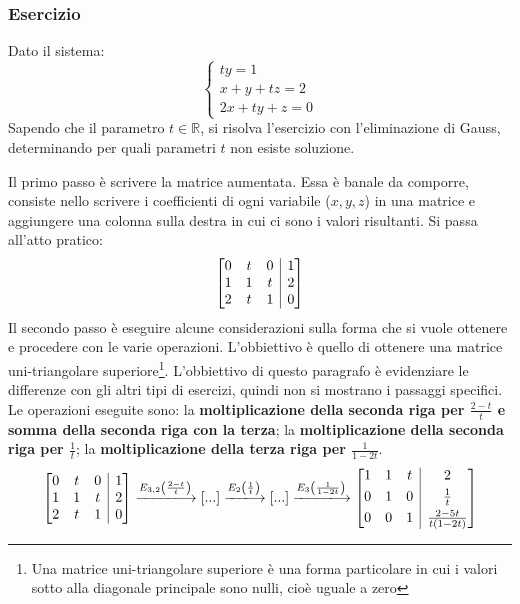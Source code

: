 \documentclass[a4paper]{article}
\makeatletter
\newenvironment{rowequmatbra}[1]{\left[\array{@{}#1@{}}}{\endarray\right]}
\makeatother
\begin{document}
	\subsubsection{Esercizio}
	
	Dato il sistema:
	\begin{equation*}
		\begin{cases}
			ty = 1 \\
			x + y + tz = 2 \\
			2x + ty + z = 0
		\end{cases}
	\end{equation*}
	Sapendo che il parametro $t \in \mathbb{R}$, si risolva l'esercizio con l'eliminazione di Gauss, determinando per quali parametri $t$ non esiste soluzione.\newline
	
	\noindent
	Il \textcolor{Red3}{primo passo} è scrivere la matrice aumentata. Essa è banale da comporre, consiste nello scrivere i coefficienti di ogni variabile ($x,y,z$) in una matrice e aggiungere una colonna sulla destra in cui ci sono i valori risultanti. Si passa all'atto pratico:
	\begin{equation*}
		\begin{rowequmatbra}{ccc|c}
			0  &  t &  0 &  1 \\
			1  &  1 &  t &  2 \\
			2  &  t &  1 &  0
		\end{rowequmatbra}
	\end{equation*}
	Il \textcolor{Red3}{secondo passo} è eseguire alcune considerazioni sulla forma che si vuole ottenere e procedere con le varie operazioni. L'obbiettivo è quello di ottenere una matrice uni-triangolare superiore\footnote{Una matrice uni-triangolare superiore è una forma particolare in cui i valori sotto alla diagonale principale sono nulli, cioè uguale a zero}. L'obbiettivo di questo paragrafo è evidenziare le differenze con gli altri tipi di esercizi, quindi non si mostrano i passaggi specifici. Le operazioni eseguite sono: la \textbf{moltiplicazione della seconda riga per $\frac{2-t}{t}$ e somma della seconda riga con la terza}; la \textbf{moltiplicazione della seconda riga per $\frac{1}{t}$}; la \textbf{moltiplicazione della terza riga per $\frac{1}{1-2t}$}.
	\begin{equation*}
		\begin{rowequmatbra}{ccc|c}
			0  &  t &  0 &  1 \\
			1  &  1 &  t &  2 \\
			2  &  t &  1 &  0
		\end{rowequmatbra} \xlongrightarrow{E_{3,2}\left(\frac{2-t}{t}\right)} \left[...\right] \xlongrightarrow{E_{2}\left(\frac{1}{t}\right)} \left[...\right] \xlongrightarrow{E_{3}\left(\frac{1}{1-2t}\right)}
		\begin{rowequmatbra}{ccc|c}
			1  &  1 &  t &  2 			\\ [0.3em]
			0  &  1 &  0 &  \frac{1}{t} \\ [0.3em]
			0  &  0 &  1 &  \frac{2-5t}{t\left(1-2t\right)} 
		\end{rowequmatbra}
	\end{equation*}
\end{document}
